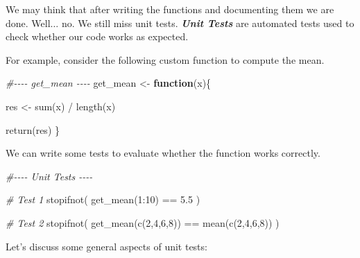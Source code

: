 \documentclass[
  11pt,
]{book}
\newenvironment{Shaded}{\begin{snugshade}}{\end{snugshade}}
\newcommand{\CommentTok}[1]{\textcolor[rgb]{0.56,0.35,0.01}{\textit{#1}}}
\newcommand{\ControlFlowTok}[1]{\textcolor[rgb]{0.13,0.29,0.53}{\textbf{#1}}}
\newcommand{\DecValTok}[1]{\textcolor[rgb]{0.00,0.00,0.81}{#1}}
\newcommand{\FloatTok}[1]{\textcolor[rgb]{0.00,0.00,0.81}{#1}}
\newcommand{\FunctionTok}[1]{\textcolor[rgb]{0.00,0.00,0.00}{#1}}
\newcommand{\NormalTok}[1]{#1}
\newcommand{\OtherTok}[1]{\textcolor[rgb]{0.56,0.35,0.01}{#1}}
\newcommand{\SpecialCharTok}[1]{\textcolor[rgb]{0.00,0.00,0.00}{#1}}
\begin{document}
We may think that after writing the functions and documenting them we are done. Well\(\ldots\) no. We still miss unit tests. \textbf{\emph{Unit Tests}} are automated tests used to check whether our code works as expected.

For example, consider the following custom function to compute the mean.

\begin{Shaded}
\begin{Highlighting}[]
\CommentTok{\#{-}{-}{-}{-}    get\_mean    {-}{-}{-}{-}}
\NormalTok{get\_mean }\OtherTok{\textless{}{-}} \ControlFlowTok{function}\NormalTok{(x)\{}
  
\NormalTok{  res }\OtherTok{\textless{}{-}} \FunctionTok{sum}\NormalTok{(x) }\SpecialCharTok{/} \FunctionTok{length}\NormalTok{(x)}
  
  \FunctionTok{return}\NormalTok{(res)}
\NormalTok{\}}
\end{Highlighting}
\end{Shaded}

We can write some tests to evaluate whether the function works correctly.

\begin{Shaded}
\begin{Highlighting}[]
\CommentTok{\#{-}{-}{-}{-}    Unit Tests    {-}{-}{-}{-}}

\CommentTok{\# Test 1}
\FunctionTok{stopifnot}\NormalTok{(}
  \FunctionTok{get\_mean}\NormalTok{(}\DecValTok{1}\SpecialCharTok{:}\DecValTok{10}\NormalTok{) }\SpecialCharTok{==} \FloatTok{5.5}
\NormalTok{  )}

\CommentTok{\# Test 2}
\FunctionTok{stopifnot}\NormalTok{(}
  \FunctionTok{get\_mean}\NormalTok{(}\FunctionTok{c}\NormalTok{(}\DecValTok{2}\NormalTok{,}\DecValTok{4}\NormalTok{,}\DecValTok{6}\NormalTok{,}\DecValTok{8}\NormalTok{)) }\SpecialCharTok{==} \FunctionTok{mean}\NormalTok{(}\FunctionTok{c}\NormalTok{(}\DecValTok{2}\NormalTok{,}\DecValTok{4}\NormalTok{,}\DecValTok{6}\NormalTok{,}\DecValTok{8}\NormalTok{))}
\NormalTok{  )}
\end{Highlighting}
\end{Shaded}

Let's discuss some general aspects of unit tests:
\end{document}
